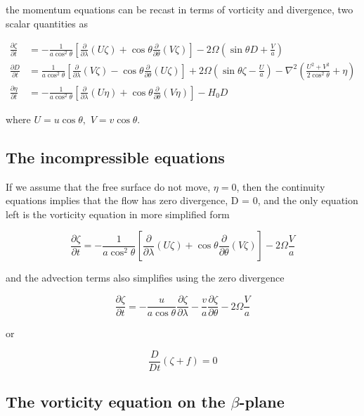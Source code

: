 the momentum equations can be recast in terms of vorticity and
divergence, two scalar quantities as

\[\begin{aligned}
\frac{\partial \zeta}{\partial t} &= -\frac{1}{a \cos^2\theta}\left[ \frac{\partial }{\partial \lambda}(U\zeta) + \cos\theta\frac{\partial }{\partial \theta}(V\zeta)\right] - 2 \Omega\left(\sin\theta D +\frac{V}{a}\right)\\
\frac{\partial D}{\partial t} &= \frac{1}{a \cos^2\theta}\left[ \frac{\partial }{\partial \lambda}(V\zeta) - \cos\theta\frac{\partial }{\partial \theta}(U\zeta)\right] + 2 \Omega\left(\sin\theta \zeta -\frac{U}{a}\right) -\nabla^2\left( \frac{U^2+V^2}{2 \cos^2\theta} + \eta\right)\\
\frac{\partial \eta}{\partial t} &= -\frac{1}{a \cos^2\theta}\left[\frac{\partial }{\partial \lambda}(U \eta) + \cos\theta\frac{\partial }{\partial \theta}(V \eta)\right]  - H_0 D
\end{aligned}\]

where \(U = u \cos\theta, \,\, V = v \cos\theta\).

\subsection{The incompressible
equations}\label{the-incompressible-equations}

If we assume that the free surface do not move, \(\eta=0\), then the
continuity equations implies that the flow has zero divergence, D = 0,
and the only equation left is the vorticity equation in more simplified
form

\[\frac{\partial \zeta}{\partial t} = -\frac{1}{a \cos^2\theta}\left[ \frac{\partial }{\partial \lambda}(U\zeta) + \cos\theta\frac{\partial }{\partial \theta}(V\zeta)\right] - 2 \Omega\frac{V}{a}\]

and the advection terms also simplifies using the zero divergence

\[\frac{\partial \zeta}{\partial t} = -\frac{u}{a \cos\theta} \frac{\partial \zeta}{\partial \lambda} -\frac{v}{a} \frac{\partial \zeta}{\partial \theta}- 2 \Omega\frac{V}{a}\]

or

\[\frac{D }{Dt}(\zeta + f) =0\]

\subsection{\texorpdfstring{The vorticity equation on the
\(\beta\)-plane}{The vorticity equation on the \textbackslash beta-plane}}\label{the-vorticity-equation-on-the-beta-plane}

